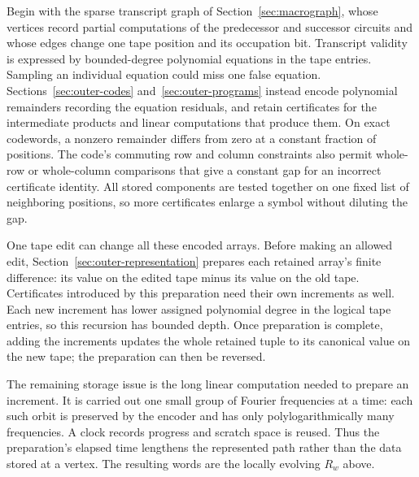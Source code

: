 Begin with the sparse transcript graph of Section~\ref{sec:macrograph},
whose vertices record partial computations of the predecessor and successor
circuits and whose edges change one tape position and its occupation bit.
Transcript validity is expressed by bounded-degree polynomial equations in
the tape entries. Sampling an individual equation could miss one false
equation. Sections~\ref{sec:outer-codes} and~\ref{sec:outer-programs}
instead encode polynomial remainders recording the equation residuals,
and retain certificates for the intermediate products and linear
computations that produce them. On exact codewords, a nonzero remainder
differs from zero at a constant fraction of positions. The code's commuting
row and column constraints also permit whole-row or whole-column comparisons
that give a constant gap for an incorrect certificate identity. All stored
components are tested together on one fixed list of neighboring positions,
so more certificates enlarge a symbol without diluting the gap.

One tape edit can change all these encoded arrays. Before making an allowed
edit, Section~\ref{sec:outer-representation} prepares each retained array's
finite difference: its value on the edited tape minus its value on the old
tape. Certificates introduced by this preparation need their own increments
as well. Each new increment has lower assigned polynomial degree in the
logical tape entries, so this recursion has bounded depth. Once preparation
is complete, adding the increments updates the whole retained tuple to its
canonical value on the new tape; the preparation can then be reversed.

The remaining storage issue is the long linear computation needed to prepare
an increment. It is carried out one small group of Fourier frequencies at a
time: each such orbit is preserved by the encoder and has only
polylogarithmically many frequencies. A clock records progress and scratch
space is reused. Thus the preparation's elapsed time lengthens the
represented path rather than the data stored at a vertex. The resulting
words are the locally evolving $R_w$ above.

